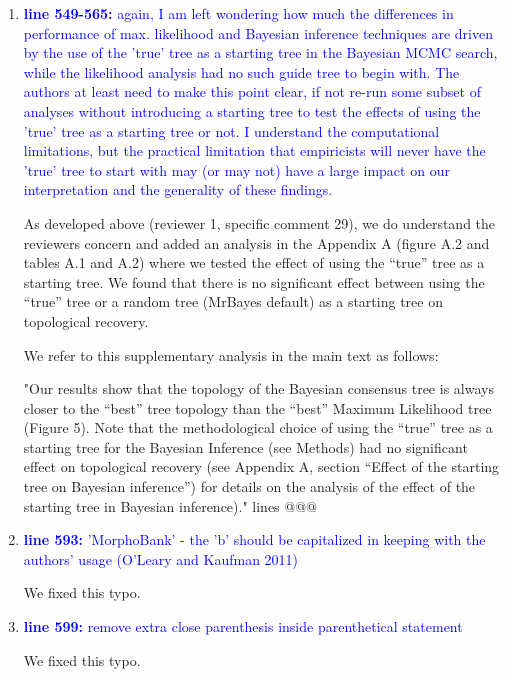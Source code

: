 \documentclass[12pt,letterpaper]{article}
\begin{document}
\begin{enumerate}
\item{\textcolor{blue}{\textbf{line 549-565:} again, I am left wondering how much the differences in performance of max. likelihood and Bayesian inference techniques are driven by the use of the 'true' tree as a starting tree in the Bayesian MCMC search, while the likelihood analysis had no such guide tree to begin with. The authors at least need to make this point clear, if not re-run some subset of analyses without introducing a starting tree to test the effects of using the 'true' tree as a starting tree or not. I understand the computational limitations, but the practical limitation that empiricists will never have the 'true' tree to start with may (or may not) have a large impact on our interpretation and the generality of these findings. }}

As developed above (reviewer 1, specific comment 29), we do understand the reviewers concern and added an analysis in the Appendix A (figure A.2 and tables A.1 and A.2) where we tested the effect of using the ``true'' tree as a starting tree. We found that there is no significant effect between using the ``true'' tree or a random tree (MrBayes default) as a starting tree on topological recovery.

We refer to this supplementary analysis in the main text as follows:

"Our results show that the topology of the Bayesian consensus tree is always closer to the ``best'' tree topology than the ``best'' Maximum Likelihood tree (Figure 5).
Note that the methodological choice of using the ``true'' tree as a starting tree for the Bayesian Inference (see Methods) had no significant effect on topological recovery (see Appendix A, section ``Effect of the starting tree on Bayesian inference'') for details on the analysis of the effect of the starting tree in Bayesian inference)." lines @@@

\item{\textcolor{blue}{\textbf{line 593:} 'MorphoBank' - the 'b' should be capitalized in keeping with the authors' usage (O'Leary and Kaufman 2011)}}

We fixed this typo.

\item{\textcolor{blue}{\textbf{line 599:} remove extra close parenthesis inside parenthetical statement}}

We fixed this typo.


\end{enumerate}
\end{document}
